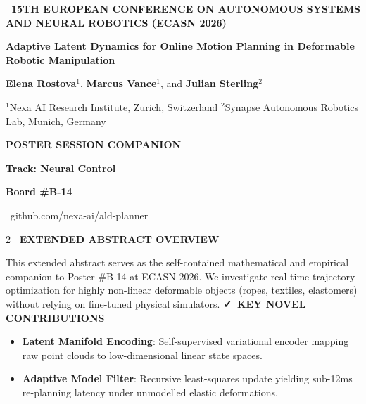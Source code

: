 \documentclass[10pt, a4paper]{scrartcl}
\newcommand{\posterheader}{%
  \begin{tcolorbox}[
    enhanced,
    colback=primary,
    colframe=primary,
    arc=3mm,
    boxrule=0pt,
    left=12pt, right=12pt, top=12pt, bottom=12pt,
    coltext=white
  ]
    \begin{minipage}[t]{0.68\textwidth}
      {\sffamily\bfseries\tiny\color{accentbg}\MakeUppercase{\faGraduationCap\ 15th European Conference on Autonomous Systems and Neural Robotics (ECASN 2026)}} \par \vspace{4pt}
      {\sffamily\bfseries\Large Adaptive Latent Dynamics for Online Motion Planning in Deformable Robotic Manipulation} \par \vspace{6pt}
      {\small\sffamily \textbf{Elena Rostova}$^{1}$, \textbf{Marcus Vance}$^{1}$, and \textbf{Julian Sterling}$^{2}$} \par \vspace{3pt}
      {\tiny\sffamily $^{1}$Nexa AI Research Institute, Zurich, Switzerland \quad $^{2}$Synapse Autonomous Robotics Lab, Munich, Germany}
    \end{minipage}%
    \hfill
    \begin{minipage}[t]{0.28\textwidth}
      \raggedleft
      \begin{tcolorbox}[
        colback=white,
        colframe=secondary,
        arc=2.5mm,
        boxrule=1.2pt,
        left=6pt, right=6pt, top=6pt, bottom=6pt,
        coltext=darktext
      ]
        \centering
        {\sffamily\bfseries\tiny \color{secondary}\MakeUppercase{Poster Session Companion}} \par \vspace{2pt}
        {\sffamily\bfseries\scriptsize Track: Neural Control} \par \vspace{1pt}
        {\sffamily\bfseries\Large \color{primary} Board \#B-14} \par \vspace{3pt}
        {\tiny\sffamily \faLink\ github.com/nexa-ai/ald-planner}
      \end{tcolorbox}
    \end{minipage}
  \end{tcolorbox}
}
\begin{document}
\posterheader

\vspace{-2pt}

\begin{tcolorbox}[
  enhanced,
  colback=accentbg,
  colframe=secondary,
  arc=2mm,
  boxrule=0.8pt,
  left=10pt, right=10pt, top=7pt, bottom=7pt
]
  \begin{multicols}{2}
    {\sffamily\bfseries\small \color{secondary} \faInfoCircle\ EXTENDED ABSTRACT OVERVIEW} \par \vspace{2pt}
    \small This extended abstract serves as the self-contained mathematical and empirical companion to Poster \#B-14 at ECASN 2026. We investigate real-time trajectory optimization for highly non-linear deformable objects (ropes, textiles, elastomers) without relying on fine-tuned physical simulators.
    \columnbreak
    {\sffamily\bfseries\small \color{secondary} \faCheck\ KEY NOVEL CONTRIBUTIONS} \par \vspace{2pt}
    \begin{itemize}[leftmargin=12pt, topsep=1pt, itemsep=1pt, parsep=0pt]
      \item \textbf{Latent Manifold Encoding}: Self-supervised variational encoder mapping raw point clouds to low-dimensional linear state spaces.
      \item \textbf{Adaptive Model Filter}: Recursive least-squares update yielding sub-12ms re-planning latency under unmodelled elastic deformations.
    \end{itemize}
  \end{multicols}
\end{tcolorbox}

\vspace{-2pt}
\end{document}
